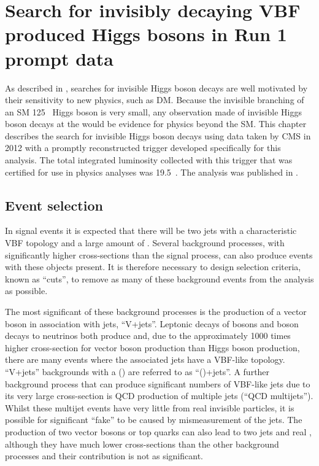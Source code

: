 \chapter{Search for invisibly decaying VBF produced Higgs bosons in Run 1 prompt data}
\label{chap:prompt}
As described in , searches for invisible Higgs boson decays are well motivated by their sensitivity to new physics, such as \ac{DM}. Because the invisible branching of an \ac{SM} 125 \GeV\, Higgs boson is very small, any observation made of invisible Higgs boson decays at the \LHC would be evidence for physics beyond the \ac{SM}. This chapter describes the search for invisible Higgs boson decays using data taken by CMS in 2012 with a promptly reconstructed trigger developed specifically for this analysis. The total integrated luminosity collected with this trigger that was certified for use in physics analyses was 19.5\invfb~. The analysis was published in .

\section{Event selection}
\label{sec:promptsel}
In signal events it is expected that there will be two jets with a characteristic \ac{VBF} topology and a large amount of \MET. Several background processes, with significantly higher cross-sections than the signal process, can also produce events with these objects present. It is therefore necessary to design selection criteria, known as ``cuts'', to remove as many of these background events from the analysis as possible.

The most significant of these background processes is the production of a vector boson in association with jets, ``V+jets''. Leptonic decays of \PW bosons and \PZ boson decays to neutrinos both produce \MET and, due to the approximately 1000 times higher cross-section for vector boson production than Higgs boson production, there are many events where the associated jets have a \ac{VBF}-like topology. ``V+jets'' backgrounds with a \PW (\PZ) are referred to as ``\PW(\PZ)+jets''.
A further background process that can produce significant numbers of \ac{VBF}-like jets due to its very large cross-section is \ac{QCD} production of multiple jets (``\ac{QCD} multijets''). Whilst these multijet events have very little \MET from real invisible particles, it is possible for significant ``fake'' \MET to be caused by mismeasurement of the jets. The production of two vector bosons or top quarks can also lead to two jets and real \MET, although they have much lower cross-sections than the other background processes and their contribution is not as significant. %

